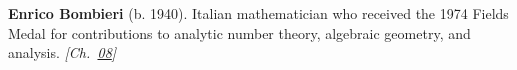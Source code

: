 \textbf{Enrico Bombieri} (b. 1940). Italian mathematician who received the 1974 Fields Medal for contributions to analytic number theory, algebraic geometry, and analysis. \emph{[Ch.~\hyperref[ch:boundedprimegaps]{08}]}

